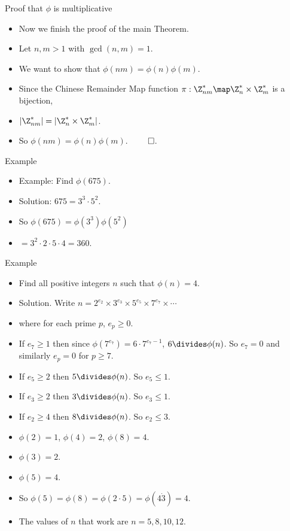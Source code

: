 \documentclass[handout]{beamer}
\begin{document}
\begin{frame}{Proof that $\phi$ is multiplicative}

\begin{itemize}
  \item Now we finish the proof of the main Theorem.
  \item Let $n,m>1$ with $\gcd(n,m)=1$.
  \item We want to show that $\phi(nm) = \phi(n)\phi(m)$.
  \item Since the Chinese Remainder Map function $\pi:\Z^*_{nm}\map \Z^*_n\times \Z^*_m$ is a bijection,
  \item $|\Z^*_{nm}| = |\Z^*_n\times \Z^*_m|$.
  \item So $\phi(nm) = \phi(n)\phi(m)$. $\qed$.
\end{itemize}

\end{frame}

\begin{frame}{Example}

\begin{itemize}
  \item Example: Find $\phi(675)$.
  \item Solution: $675 = 3^3 \cdot 5^2$.
  \item So $\phi(675) = \phi(3^3)\phi(5^2)$
  \item $=3^2\cdot 2 \cdot 5 \cdot 4 = 360$.
\end{itemize}

\end{frame}

\begin{frame}{Example}

\begin{itemize}
  \item Find all positive integers $n$ such that $\phi(n) = 4$.
  \item Solution. Write $n=2^{e_2}\times 3^{e_3} \times 5^{e_5} \times 7^{e_7}\times \cdots$
  \item where for each prime $p$, $e_p\geq 0$.
  \item If $e_7\geq 1$ then since $\phi(7^{e_7})=6\cdot 7^{e_7-1}$, $6\divides \phi(n)$. So $e_7=0$ and similarly $e_p=0$ for $p\geq 7$.
  \item If $e_5 \geq 2$ then $5\divides \phi(n)$. So $e_5 \leq 1$.
  \item If $e_3 \geq 2$ then $3\divides \phi(n)$. So $e_3 \leq 1$.
  \item If $e_2 \geq 4$ then $8 \divides \phi(n)$. So $e_2 \leq 3$.
  \item $\phi(2)=1$, $\phi(4)=2$, $\phi(8) = 4$.
  \item $\phi(3) = 2$.
  \item $\phi(5) = 4$.
  \item So $\phi(5) = \phi(8) = \phi(2\cdot 5) = \phi(4\dot 3) = 4$.
  \item The values of $n$ that work are $n=5,8,10,12$.
\end{itemize}

\end{frame}
\end{document}
